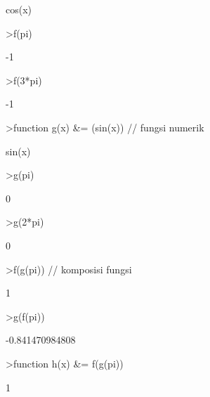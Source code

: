 \documentclass[a4paper,10pt]{article}
\begin{document}
\begin{eulernotebook}
\begin{eulercomment}
\begin{eulercomment}
\begin{eulercomment}
\begin{eulercomment}
\begin{eulercomment}
\begin{eulercomment}
\begin{eulercomment}
\begin{eulercomment}
\begin{eulercomment}
\begin{eulercomment}
\begin{eulercomment}
\begin{eulercomment}
\begin{eulercomment}
\begin{eulercomment}
\begin{eulercomment}
\begin{eulercomment}
\begin{eulercomment}
\begin{eulercomment}
\begin{euleroutput}
  
                                  cos(x)
  
\end{euleroutput}
\begin{eulerprompt}
>f(pi)
\end{eulerprompt}
\begin{euleroutput}
  -1
\end{euleroutput}
\begin{eulerprompt}
>f(3*pi)
\end{eulerprompt}
\begin{euleroutput}
  -1
\end{euleroutput}
\begin{eulerprompt}
>function g(x) &= (sin(x)) // fungsi numerik
\end{eulerprompt}
\begin{euleroutput}
  
                                  sin(x)
  
\end{euleroutput}
\begin{eulerprompt}
>g(pi)
\end{eulerprompt}
\begin{euleroutput}
  0
\end{euleroutput}
\begin{eulerprompt}
>g(2*pi)
\end{eulerprompt}
\begin{euleroutput}
  0
\end{euleroutput}
\begin{eulerprompt}
>f(g(pi)) // komposisi fungsi
\end{eulerprompt}
\begin{euleroutput}
  1
\end{euleroutput}
\begin{eulerprompt}
>g(f(pi))
\end{eulerprompt}
\begin{euleroutput}
  -0.841470984808
\end{euleroutput}
\begin{eulerprompt}
>function h(x) &= f(g(pi))
\end{eulerprompt}
\begin{euleroutput}
  
                                    1
  

\end{euleroutput}
\end{eulercomment}
\end{eulercomment}
\end{eulercomment}
\end{eulercomment}
\end{eulercomment}
\end{eulercomment}
\end{eulercomment}
\end{eulercomment}
\end{eulercomment}
\end{eulercomment}
\end{eulercomment}
\end{eulercomment}
\end{eulercomment}
\end{eulercomment}
\end{eulercomment}
\end{eulercomment}
\end{eulercomment}
\end{eulercomment}
\end{eulernotebook}
\end{document}
